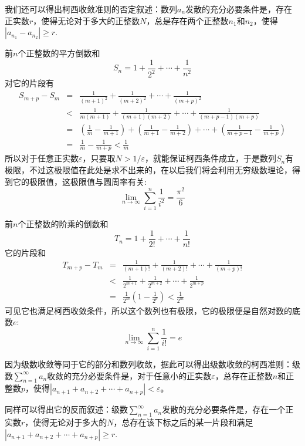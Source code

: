 我们还可以得出柯西收敛准则的否定叙述：数列$a_n$发散的充分必要条件是，存在正实数$r$，使得无论对于多大的正整数$N$，总是存在两个正整数$n_1$和$n_2$，使得$|a_{n_1}-a_{n_2}| \geqslant r$.

\begin{example}
  前$n$个正整数的平方倒数和
  \[ S_n = 1 + \frac{1}{2^2} + \cdots + \frac{1}{n^2} \]
  对它的片段有
  \begin{eqnarray*}
    S_{m+p}-S_m  & = & \frac{1}{(m+1)^2} + \frac{1}{(m+2)^2} + \cdots + \frac{1}{(m+p)^2} \\
                 & < & \frac{1}{m(m+1)} + \frac{1}{(m+1)(m+2)} + \cdots + \frac{1}{(m+p-1)(m+p)} \\
                 & = & \left( \frac{1}{m} - \frac{1}{m+1} \right) + \left( \frac{1}{m+1} - \frac{1}{m+2} \right) + \cdots + \left( \frac{1}{m+p-1} - \frac{1}{m+p} \right) \\
    & = & \frac{1}{m} - \frac{1}{m+p} < \frac{1}{m}
  \end{eqnarray*}
  所以对于任意正实数$\varepsilon$，只要取$N>1/\varepsilon$，就能保证柯西条件成立，于是数列$S_n$有极限，不过这极限值在此处是求不出来的，在以后我们将会利用无穷级数理论，得到它的极限值，这极限值与圆周率有关:
  \[ \lim_{n \to \infty} \sum_{i=1}^n \frac{1}{i^2} = \frac{\pi^2}{6} \]
\end{example}

\begin{example}
  前$n$个正整数的阶乘的倒数和
  \[ T_n = 1 + \frac{1}{2!} + \cdots + \frac{1}{n!} \]
  它的片段和
  \begin{eqnarray*}
    T_{m+p} - T_m & = & \frac{1}{(m+1)!} + \frac{1}{(m+2)!} + \cdots + \frac{1}{(m+p)!} \\
                  & < & \frac{1}{2^{m+1}} + \frac{1}{2^{m+2}} + \cdots + \frac{1}{2^{m+p}} \\
    & = & \frac{1}{2^m} \left( 1-\frac{1}{2^p} \right) < \frac{1}{2^m}
  \end{eqnarray*}
  可见它也满足柯西收敛条件，所以这个数列也有极限，它的极限便是自然对数的底数$e$:
  \[ \lim_{n \to \infty} \sum_{i=1}^n \frac{1}{i!} = e \]
\end{example}

\begin{example}[级数收敛的柯西准则]
  因为级数收敛等同于它的部分和数列收敛，据此可以得出级数收敛的柯西准则：级数$\sum_{n=1}^{\infty} a_n$收敛的充分必要条件是，对于任意小的正实数$\varepsilon$，总存在正整数$n$和正整数$p$，使得$|a_{n+1}+a_{n+2} + \cdots + a_{n+p}|<\varepsilon$。

  同样可以得出它的反而叙述：级数$\sum_{n=1}^{\infty} a_n$发散的充分必要条件是，存在一个正实数$r$，使得无论对于多大的$N$，总存在该下标之后的某一片段和满足$|a_{n+1}+a_{n+2}+\cdots+a_{n+p}| \geqslant r$.
\end{example}

